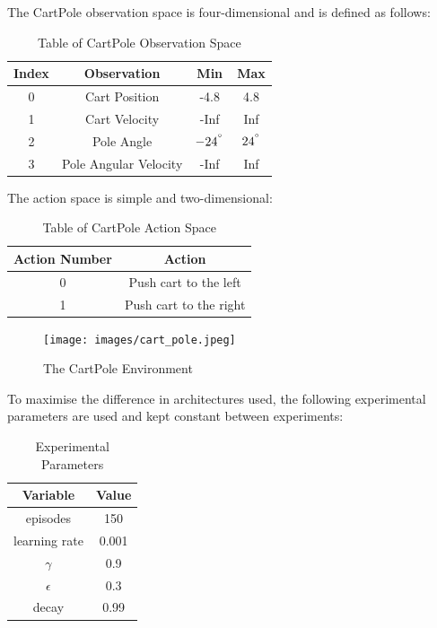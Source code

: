 \documentclass{article}
\begin{document}
The CartPole observation space is four-dimensional and is defined as follows: 

\begin{table}[H]
    \centering
    \begin{tabular}{|c|c|c|c|}
    \hline
    Index & Observation & Min & Max \\
    \hline
    0 & Cart Position & -4.8 & 4.8 \\ 
    1 & Cart Velocity & -Inf & Inf \\
    2 & Pole Angle & $-24^{\degree}$ & $24^{\degree}$\\
    3 & Pole Angular Velocity & -Inf & Inf \\
    \hline
    \end{tabular}
    \caption{Table of CartPole Observation Space}
    \label{tab:obs_space}
\end{table}




The action space is simple and two-dimensional: 

\begin{table}[H]
    \centering
    \begin{tabular}{|c|c|}
    \hline
    Action Number & Action  \\
    \hline
    0 & Push cart to the left \\
    1 & Push cart to the right \\
    \hline
    \end{tabular}    
    \caption{Table of CartPole Action Space}
    \label{tab:act_space}
\end{table}



\begin{figure}[H]
    \centering
    \texttt{[image: images/cart\_pole.jpeg]}
    \caption{The CartPole Environment}
    \label{fig:cartpole}
\end{figure}

\newpage

To maximise the difference in architectures used, the following experimental parameters are used and kept constant between experiments: 

\begin{table}[H]
    \centering
    \begin{tabular}{c|c}
    \hline
    Variable & Value \\
    \hline
    episodes & 150  \\
    learning rate & 0.001 \\
    $\gamma$ & 0.9 \\
    $\epsilon$ & 0.3 \\
    decay & 0.99 \\
    \hline
    \end{tabular}
    \caption{Experimental Parameters}
    \label{tab:params}
\end{table}
\end{document}
